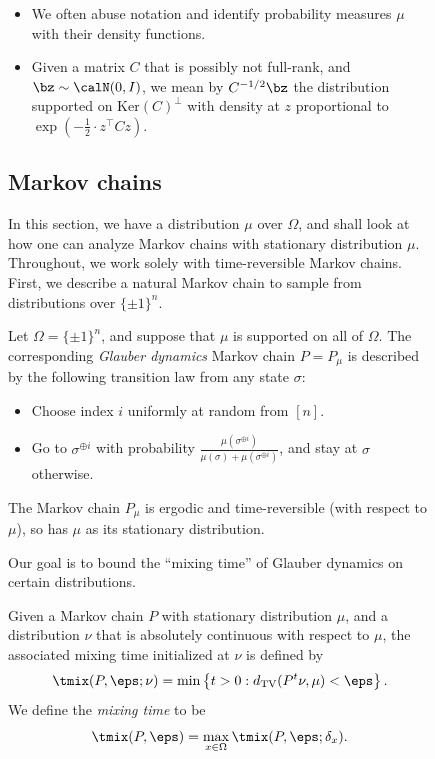 \documentclass[11pt,letterpaper]{article}
\begin{document}
\begin{figure}
\begin{itemize}
        \item We often abuse notation and identify probability measures $\mu$ with their density functions.
        \item Given a matrix $C$ that is possibly not full-rank, and $\bz \sim \calN(0,I)$, we mean by $C^{-1/2} \bz$ the distribution supported on $\mathrm{Ker}(C)^\perp$ with density at $z$ proportional to $\exp\left(-\frac{1}{2} \cdot z^\top C z\right)$.
    \end{itemize}

\subsection{Markov chains}
    
    In this section, we have a distribution $\mu$ over $\Omega$, and shall look at how one can analyze Markov chains with stationary distribution $\mu$. Throughout, we work solely with time-reversible Markov chains. 
    First, we describe a natural Markov chain to sample from distributions over $\{\pm 1\}^n$.
    \begin{definition}
        Let $\Omega = \{\pm 1\}^n$, and suppose that $\mu$ is supported on all of $\Omega$. The corresponding \emph{Glauber dynamics} Markov chain $P = P_\mu$ is described by the following transition law from any state $\sigma$:
        \begin{itemize}
            \item Choose index $i$ uniformly at random from $[n]$.
            \item Go to $\sigma^{\oplus i}$ with probability $\displaystyle\frac{\mu(\sigma^{\oplus i})}{\mu(\sigma)+\mu(\sigma^{\oplus i})}$, and stay at $\sigma$ otherwise.
        \end{itemize}
    \end{definition}

    \begin{fact}
        The Markov chain $P_\mu$ is ergodic and time-reversible (with respect to $\mu$), so has $\mu$ as its stationary distribution.
    \end{fact}

    Our goal is to bound the ``mixing time'' of Glauber dynamics on certain distributions.

    \begin{definition}
        Given a Markov chain $P$ with stationary distribution $\mu$, and a distribution $\nu$ that is absolutely continuous with respect to $\mu$, the associated mixing time initialized at $\nu$ is defined by
        \[ \tmix(P,\eps;\nu) = \min\left\{ t > 0 : d_{\mathrm{TV}}(P^t\nu,\mu) < \eps \right\}. \]
        We define the \emph{mixing time} to be
        \[ \tmix(P,\eps) = \max_{x \in \Omega}\tmix(P,\eps;\delta_x). \]
    \end{definition}


\end{figure}
\end{document}
